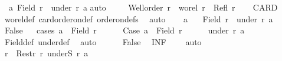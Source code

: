 \begin{isabellebody}
\ {\isachardoublequoteopen}{\isasymnot}\ {\isacharparenleft}{\kern0pt}{\isasymexists}a{\isachardot}{\kern0pt}\ Field\ r\ {\isacharequal}{\kern0pt}\ under\ r\ a{\isacharparenright}{\kern0pt}{\isachardoublequoteclose}\isanewline
%
\isadelimproof
%
\endisadelimproof
%
\isatagproof
{}\isamarkupfalse%
{\isacharparenleft}{\kern0pt}auto{\isacharparenright}{\kern0pt}\isanewline
\ \ \isamarkupfalse%
\ {}{\isacharcolon}{\kern0pt}\ {\isachardoublequoteopen}Well{\isacharunderscore}{\kern0pt}order\ r\ {\isasymand}\ wo{\isacharunderscore}{\kern0pt}rel\ r\ {\isasymand}\ Refl\ r{\isachardoublequoteclose}\isanewline
\ \ \isamarkupfalse%
\ CARD\ \isamarkupfalse%
\ wo{\isacharunderscore}{\kern0pt}rel{\isacharunderscore}{\kern0pt}def\ card{\isacharunderscore}{\kern0pt}order{\isacharunderscore}{\kern0pt}on{\isacharunderscore}{\kern0pt}def\ order{\isacharunderscore}{\kern0pt}on{\isacharunderscore}{\kern0pt}defs\ \isamarkupfalse%
\ auto\isanewline
\ \ \isamarkupfalse%
\ a\ \isamarkupfalse%
\ {\isacharasterisk}{\kern0pt}{\isacharcolon}{\kern0pt}\ {\isachardoublequoteopen}Field\ r\ {\isacharequal}{\kern0pt}\ under\ r\ a{\isachardoublequoteclose}\isanewline
\ \ \isamarkupfalse%
\ False\isanewline
\ \ \isamarkupfalse%
{\isacharparenleft}{\kern0pt}cases\ {\isachardoublequoteopen}a\ {\isasymin}\ Field\ r{\isachardoublequoteclose}{\isacharparenright}{\kern0pt}\isanewline
\ \ \ \ \isamarkupfalse%
\ Case{}{\isacharcolon}{\kern0pt}\ {\isachardoublequoteopen}a\ {\isasymnotin}\ Field\ r{\isachardoublequoteclose}\isanewline
\ \ \ \ \isamarkupfalse%
\ {\isachardoublequoteopen}under\ r\ a\ {\isacharequal}{\kern0pt}\ {\isacharbraceleft}{\kern0pt}{\isacharbraceright}{\kern0pt}{\isachardoublequoteclose}\ \isamarkupfalse%
\ Field{\isacharunderscore}{\kern0pt}def\ under{\isacharunderscore}{\kern0pt}def\ \isamarkupfalse%
\ auto\isanewline
\ \ \ \ \isamarkupfalse%
\ False\ \isamarkupfalse%
\ INF\ {\isacharasterisk}{\kern0pt}\ \ \isamarkupfalse%
\ auto\isanewline
\ \ \isamarkupfalse%
\isanewline
\ \ \ \ \isamarkupfalse%
\ {\isacharquery}{\kern0pt}r{\isacharprime}{\kern0pt}\ {\isacharequal}{\kern0pt}\ {\isachardoublequoteopen}Restr\ r\ {\isacharparenleft}{\kern0pt}underS\ r\ a{\isacharparenright}{\kern0pt}{\isachardoublequoteclose}\isanewline
\ \ \ \ \isamarkupfalse%

\end{isabellebody}
